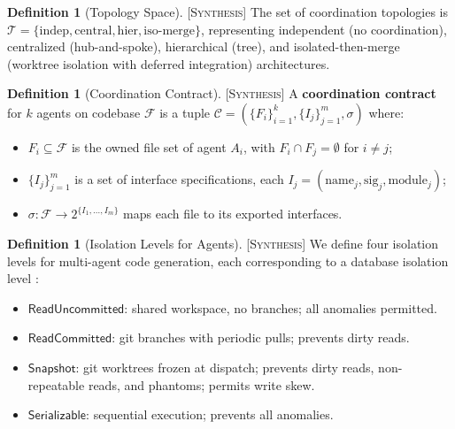 \documentclass[11pt]{article}
\theoremstyle{definition}
\newtheorem{definition}[theorem]{Definition}
\theoremstyle{remark}
\newcommand{\synthesis}{\textsc{[Synthesis]}}
\begin{document}
\begin{definition}[Topology Space] \synthesis{}
\label{def:topology}
The set of coordination topologies is $\mathcal{T} = \{\mathrm{indep}, \mathrm{central}, \mathrm{hier}, \mathrm{iso\text{-}merge}\}$, representing independent (no coordination), centralized (hub-and-spoke), hierarchical (tree), and isolated-then-merge (worktree isolation with deferred integration) architectures.
\end{definition}

\begin{definition}[Coordination Contract] \synthesis{}
\label{def:contract}
A \textbf{coordination contract} for $k$ agents on codebase $\mathcal{F}$ is a tuple $\mathcal{C} = (\{F_i\}_{i=1}^k, \{I_j\}_{j=1}^m, \sigma)$ where:
\begin{itemize}[nosep]
  \item $F_i \subseteq \mathcal{F}$ is the owned file set of agent $A_i$, with $F_i \cap F_j = \emptyset$ for $i \neq j$;
  \item $\{I_j\}_{j=1}^m$ is a set of interface specifications, each $I_j = (\mathrm{name}_j, \mathrm{sig}_j, \mathrm{module}_j)$;
  \item $\sigma: \mathcal{F} \to 2^{\{I_1,\ldots,I_m\}}$ maps each file to its exported interfaces.
\end{itemize}
\end{definition}

\begin{definition}[Isolation Levels for Agents] \synthesis{}
\label{def:isolation}
We define four isolation levels for multi-agent code generation, each corresponding to a database isolation level \citep{Berenson1995}:
\begin{itemize}[nosep]
  \item $\mathsf{ReadUncommitted}$: shared workspace, no branches; all anomalies permitted.
  \item $\mathsf{ReadCommitted}$: git branches with periodic pulls; prevents dirty reads.
  \item $\mathsf{Snapshot}$: git worktrees frozen at dispatch; prevents dirty reads, non-repeatable reads, and phantoms; permits write skew.
  \item $\mathsf{Serializable}$: sequential execution; prevents all anomalies.
\end{itemize}
\end{definition}


\end{document}

